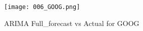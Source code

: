 \documentclass{article}
\begin{document}
\begin{figure}[h]
\centering
\texttt{[image: 006\_GOOG.png]}
\caption{ARIMA Full_forecast vs Actual for GOOG}
\label{fig:GOOG_full_forecast}
\end{figure}
\end{document}
